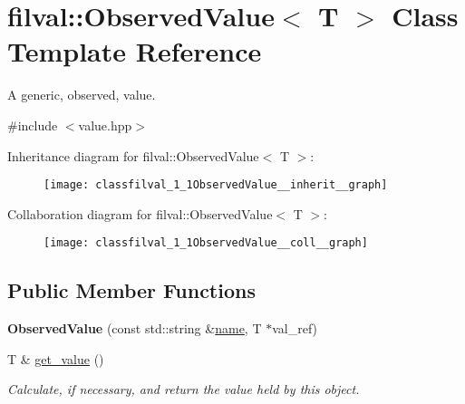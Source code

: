\hypertarget{classfilval_1_1ObservedValue}{}\section{filval\+:\+:Observed\+Value$<$ T $>$ Class Template Reference}
\label{classfilval_1_1ObservedValue}


A generic, observed, value.  




{\ttfamily \#include $<$value.\+hpp$>$}



Inheritance diagram for filval\+:\+:Observed\+Value$<$ T $>$\+:
\nopagebreak
\begin{figure}[H]
\begin{center}
\leavevmode
\texttt{[image: classfilval\_1\_1ObservedValue\_\_inherit\_\_graph]}
\end{center}
\end{figure}


Collaboration diagram for filval\+:\+:Observed\+Value$<$ T $>$\+:
\nopagebreak
\begin{figure}[H]
\begin{center}
\leavevmode
\texttt{[image: classfilval\_1\_1ObservedValue\_\_coll\_\_graph]}
\end{center}
\end{figure}
\subsection*{Public Member Functions}
\begin{DoxyCompactItemize}
\item 
\hypertarget{classfilval_1_1ObservedValue_a0bce29e7d100187548c7ba3ef80f9c89}{}\label{classfilval_1_1ObservedValue_a0bce29e7d100187548c7ba3ef80f9c89} 
{\bfseries Observed\+Value} (const std\+::string \&\hyperlink{classfilval_1_1GenValue_a007e38c03ee041c2a657afa3d6e91ab1}{name}, T $\ast$val\+\_\+ref)
\item 
\hypertarget{classfilval_1_1ObservedValue_af38ebd68326b8282a9f769f89021e46a}{}\label{classfilval_1_1ObservedValue_af38ebd68326b8282a9f769f89021e46a} 
T \& \hyperlink{classfilval_1_1ObservedValue_af38ebd68326b8282a9f769f89021e46a}{get\+\_\+value} ()
\begin{DoxyCompactList}\small\item\em Calculate, if necessary, and return the value held by this object. \end{DoxyCompactList}\end{DoxyCompactItemize}
